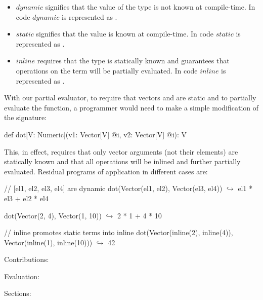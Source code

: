 \begin{itemize}
 \item $dynamic$ signifies that the value of the type is not known at compile-time. In code $dynamic$ is represented as .
 \item $static$ signifies that the value is known at compile-time. In code $static$ is represented as .
 \item $inline$ requires that the type is statically known and guarantees that operations on the term will be partially evaluated. In code $inline$ is represented as .
\end{itemize}

With our partial evaluator, to require that vectors  and  are static and
to partially evaluate the function, a programmer would need to make a simple modification of
the  signature:
\vspace{1.8mm}
\begin{listing}
  def dot[V: Numeric](v1: Vector[V] @i, v2: Vector[V] @i): V
\end{listing}
\vspace{1.8mm}
This, in effect, requires that only vector arguments (not their elements) are statically known and that all operations will be inlined and further partially evaluated. Residual programs of  application in different cases are:

\vspace{1.8mm}
\begin{listing}[mathescape]
  // [el1, el2, el3, el4] are dynamic
  dot(Vector(el1, el2), Vector(el3, el4))
    $\hookrightarrow$ el1 * el3 + el2 * el4

  dot(Vector(2, 4), Vector(1, 10))
    $\hookrightarrow$ 2 * 1 + 4 * 10

  // inline promotes static terms into inline
  dot(Vector(inline(2), inline(4)), Vector(inline(1), inline(10)))
    $\hookrightarrow$ 42
\end{listing}
\vspace{1.8mm}

Contributions:

Evaluation:

Sections:
